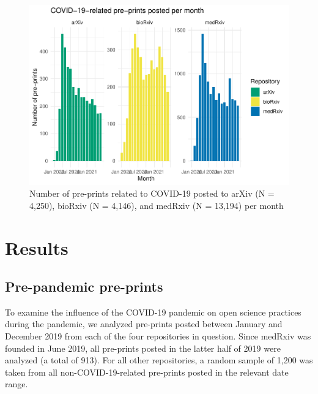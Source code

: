 \documentclass[
]{article}
\begin{document}
\begin{figure}[H]

{\centering \includegraphics[width=0.9\linewidth]{paper_files/figure-latex/monthly-papers-total-1} 

}

\caption{Number of pre-prints related to COVID-19 posted to arXiv (N = 4,250), bioRxiv (N = 4,146), and medRxiv (N = 13,194) per month}\label{fig:monthly-papers-total}
\end{figure}

\hypertarget{results}{%
\section{Results}\label{results}}

\hypertarget{pre-pandemic-pre-prints}{%
\subsection{Pre-pandemic pre-prints}\label{pre-pandemic-pre-prints}}

To examine the influence of the COVID-19 pandemic on open science practices during the pandemic, we analyzed pre-prints posted between January and December 2019 from each of the four repositories in question. Since medRxiv was founded in June 2019, all pre-prints posted in the latter half of 2019 were analyzed (a total of 913). For all other repositories, a random sample of 1,200 was taken from all non-COVID-19-related pre-prints posted in the relevant date range.
\end{document}
